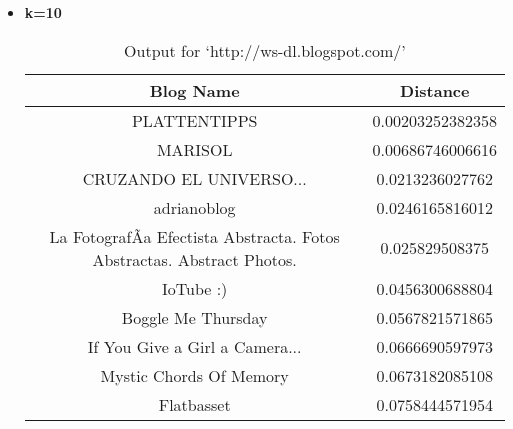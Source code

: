 \begin{itemize}
\item \textbf{ k=10}
\begin{table}
\caption{Output for `http://ws-dl.blogspot.com/'}
\begin{center}
\hspace{-2cm}
\begin{tabular}{|c|c|}
\hline
 \textbf{Blog Name} & \textbf{Distance}\\ \hline
PLATTENTIPPS   & 0.00203252382358	 \\ \hline
MARISOL & 0.00686746006616	  \\ \hline
CRUZANDO EL UNIVERSO... &0.0213236027762	  \\ \hline
adrianoblog  &   0.0246165816012	  \\ \hline
La FotografÃ­a Efectista Abstracta. Fotos Abstractas. Abstract  Photos.& 0.025829508375	  \\ \hline
IoTube     :)   &0.0456300688804	  \\ \hline
Boggle Me Thursday   &   0.0567821571865	  \\ \hline
If You Give a Girl a Camera...&  0.0666690597973	  \\ \hline
Mystic Chords Of Memory& 0.0673182085108	   \\ \hline
Flatbasset   &   0.0758444571954	  \\ \hline
\end{tabular}
\end{center}
\end{table}


\end{itemize}
